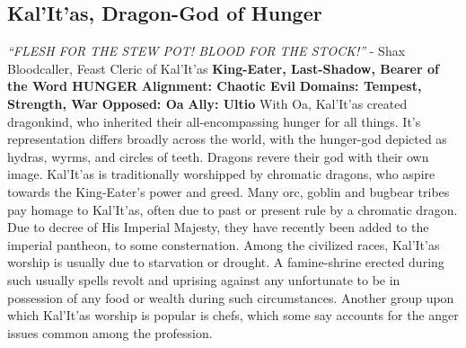 \subsection{Kal'It'as, Dragon-God of Hunger}\label{god:kalitas}
\textit{“FLESH FOR THE STEW POT! BLOOD FOR THE STOCK!”}
\break
\hspace*{\fill}- Shax Bloodcaller, Feast Cleric of Kal’It’as
\break
\break
\textbf{King-Eater, Last-Shadow, Bearer of the Word HUNGER}\break
\hspace*{\fill}\break
\textbf{Alignment:\hspace*{\fill} Chaotic Evil} \break
\textbf{Domains:\hspace*{\fill} Tempest, Strength, War} \break
\textbf{Opposed:\hspace*{\fill} Oa} \break
\textbf{Ally:\hspace*{\fill} Ultio} \break
\hspace*{\fill}\break
With Oa, Kal’It’as created dragonkind, who inherited their all-encompassing hunger for all things. It’s representation differs broadly across the world, with the hunger-god depicted as hydras, wyrms, and circles of teeth. Dragons revere their god with their own image.\newline
Kal’It’as is traditionally worshipped by chromatic dragons, who aspire towards the King-Eater’s power and greed. Many orc, goblin and bugbear tribes pay homage to Kal’It’as, often due to past or present rule by a chromatic dragon. Due to decree of His Imperial Majesty, they have recently been added to the imperial pantheon, to some consternation.\newline
Among the civilized races, Kal’It’as worship is usually due to starvation or drought. A famine-shrine erected during such usually spells revolt and uprising against any unfortunate to be in possession of any food or wealth during such circumstances.\newline
Another group upon which Kal’It’as worship is popular is chefs, which some say accounts for the anger issues common among the profession.

